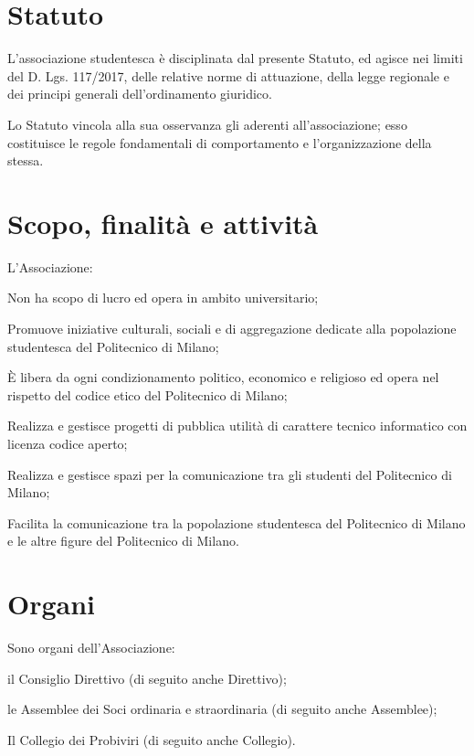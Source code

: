 \documentclass[legalpaper, 11pt]{exam}
\let\tempone\enumerate
\let\temptwo\endenumerate
\renewenvironment{enumerate}{\tempone\addtolength{\itemsep}{-0.45\baselineskip}}{\temptwo}
\begin{document}
{\section{Statuto}
\begin{enumerate}
 \item L’associazione studentesca è disciplinata dal presente Statuto, ed agisce nei limiti del D. Lgs. 117/2017, delle relative norme di attuazione, della legge regionale e dei principi generali dell’ordinamento giuridico.
 \item Lo Statuto vincola alla sua osservanza gli aderenti all’associazione; esso costituisce le regole fondamentali di comportamento e l’organizzazione della stessa.
\end{enumerate}

\section{Scopo, finalità e attività}
L’Associazione: 
\vspace{-5pt}
\begin{enumerate}
 \item Non ha scopo di lucro ed opera in ambito universitario;
 \item Promuove iniziative culturali, sociali e di aggregazione dedicate alla popolazione studentesca del Politecnico di Milano;
 \item È libera da ogni condizionamento politico, economico e religioso ed opera nel rispetto del codice etico del Politecnico di Milano;
 \item Realizza e gestisce progetti di pubblica utilità di carattere tecnico informatico con licenza codice aperto;
 \item Realizza e gestisce spazi per la comunicazione tra gli studenti del Politecnico di Milano;
 \item Facilita la comunicazione tra la popolazione studentesca del Politecnico di Milano e le altre figure del Politecnico di Milano.
\end{enumerate}

\section{Organi}
Sono organi dell’Associazione: 
\vspace{-5pt}
\begin{enumerate}
 \item il Consiglio Direttivo (di seguito anche Direttivo);
 \item le Assemblee dei Soci ordinaria e straordinaria (di seguito anche Assemblee);
 \item Il Collegio dei Probiviri (di seguito anche Collegio).
\end{enumerate}

}
\end{document}
